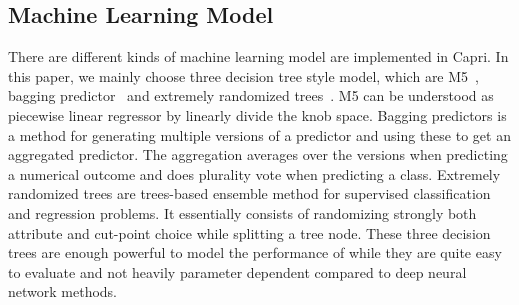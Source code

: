   \subsection{Machine Learning Model}
  \label{sec:matching_learning_model}
  There are different kinds of machine learning model are implemented in Capri.
  In this paper, we mainly choose three decision tree style model, which are
  M5~\cite{quinlan1992learning}, bagging predictor~\cite{breiman1996bagging}
  and extremely randomized trees~\cite{geurts2006extremely}. M5 can be
  understood as piecewise linear regressor by linearly divide the knob space.
  Bagging predictors is a method for generating multiple versions of a
  predictor and using these to get an aggregated predictor. The aggregation
  averages over the versions when predicting a numerical outcome and does
  plurality vote when predicting a class. Extremely randomized trees are
  trees-based ensemble method for supervised classification and regression
  problems. It essentially consists of randomizing strongly both attribute
  and cut-point choice while splitting a tree node. These three decision trees
  are enough powerful to model the performance of \gem while they are quite
  easy to evaluate and not heavily parameter dependent compared to
  deep neural network methods.

